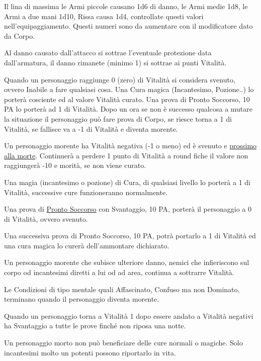 \documentclass[12pt,a4paper,twoside,openany]{book}
\begin{document}
\begin{multicols}{2}

Il lina di massima le Armi piccole causano 1d6 di danno, le Armi medie 1d8, le Armi a due mani 1d10, Rissa causa 1d4, controllate questi valori nell'equipaggiamento. Questi numeri sono da aumentare con il modificatore dato da Corpo.

Al danno causato dall'attacco si sottrae l'eventuale protezione data dall'armatura, il danno rimanete (minimo 1) si sottrae ai punti Vitalità.

Quando un personaggio raggiunge 0 (zero) di Vitalità si considera svenuto, ovvero Inabile a fare qualsiasi cosa. Una Cura magica (Incantesimo, Pozione..) lo porterà cosciente ed al valore Vitalità curato. Una prova di Pronto Soccorso, 10 PA lo porterà ad 1 di Vitalità. Dopo un ora se non è successo qualcosa a mutare la situazione il personaggio può fare prova di Corpo, se riesce torna a 1 di Vitalità, se fallisce va a -1 di Vitalità e diventa morente.

Un personaggio morente ha Vitalità negativa (-1 o meno) ed è svenuto e \hyperlink{morente}{prossimo alla morte}. Continuerà a perdere 1 punto di  Vitalità a round fiche il valore non raggiungerà -10 e morità, se non viene curato.

Una magia (incantesimo o pozione) di Cura, di qualsiasi livello lo porterà a 1 di Vitalità, successive cure funzioneranno normalmente.

Una prova di \hyperlink{prontosoccorso}{Pronto Soccorso} con Svantaggio, 10 PA, porterà il personaggio a 0 di Vitalità, ovvero svenuto. 

Una successiva prova di Pronto Soccorso, 10 PA, potrà portarlo a 1 di Vitalità ed una cura magica lo curerà dell'ammontare dichiarato.

Un personaggio morente che subisce ulteriore danno, nemici che infieriscono sul corpo od incantesimi diretti a lui od ad area, continua a sottrarre Vitalità. 

Le Condizioni di tipo mentale quali Affascinato, Confuso ma non Dominato, terminano quando il personaggio diventa morente.

Quando un personaggio torna a Vitalità 1 dopo essere andato a Vitalità negativi ha Svantaggio a tutte le prove finché non riposa una notte.

Un personaggio morto non può beneficiare delle cure normali o magiche. Solo incantesimi molto un potenti possono riportarlo in vita.


\end{multicols}
\end{document}
